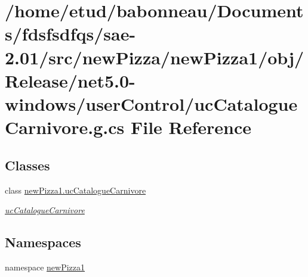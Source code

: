 \hypertarget{Release_2net5_80-windows_2userControl_2ucCatalogueCarnivore_8g_8cs}{}\section{/home/etud/babonneau/\+Documents/fdsfsdfqs/sae-\/2.01/src/new\+Pizza/new\+Pizza1/obj/\+Release/net5.0-\/windows/user\+Control/uc\+Catalogue\+Carnivore.g.\+cs File Reference}
\label{Release_2net5_80-windows_2userControl_2ucCatalogueCarnivore_8g_8cs}
\subsection*{Classes}
\begin{DoxyCompactItemize}
\item 
class \hyperlink{classnewPizza1_1_1ucCatalogueCarnivore}{new\+Pizza1.\+uc\+Catalogue\+Carnivore}
\begin{DoxyCompactList}\small\item\em \hyperlink{classnewPizza1_1_1ucCatalogueCarnivore}{uc\+Catalogue\+Carnivore} \end{DoxyCompactList}\end{DoxyCompactItemize}
\subsection*{Namespaces}
\begin{DoxyCompactItemize}
\item 
namespace \hyperlink{namespacenewPizza1}{new\+Pizza1}
\end{DoxyCompactItemize}
